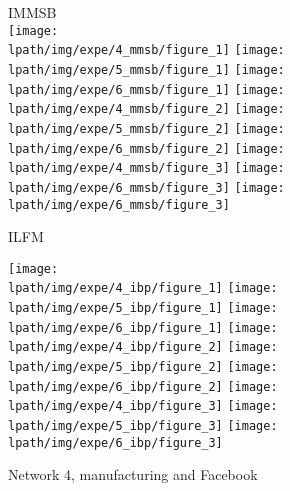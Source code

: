 \documentclass[a4paper, 12pt]{article}
\begin{document}
\begin{figure}[ht]
    \vspace{-3cm}
	\centering IMMSB\\
	\texttt{[image: \\lpath/img/expe/4\_mmsb/figure\_1]}
	\endminipage
	\texttt{[image: \\lpath/img/expe/5\_mmsb/figure\_1]}
	\endminipage
	\texttt{[image: \\lpath/img/expe/6\_mmsb/figure\_1]}
	\endminipage
		\vspace{-0.29cm}
	\texttt{[image: \\lpath/img/expe/4\_mmsb/figure\_2]}
	\endminipage
	\texttt{[image: \\lpath/img/expe/5\_mmsb/figure\_2]} 
	\endminipage
	\texttt{[image: \\lpath/img/expe/6\_mmsb/figure\_2]}
	\endminipage
		\vspace{-0.28cm}
	\texttt{[image: \\lpath/img/expe/4\_mmsb/figure\_3]}
	\endminipage
	\texttt{[image: \\lpath/img/expe/6\_mmsb/figure\_3]} 
	\endminipage
	\texttt{[image: \\lpath/img/expe/6\_mmsb/figure\_3]}
	\endminipage

    \vspace{0.2cm}
	 ILFM

	\texttt{[image: \\lpath/img/expe/4\_ibp/figure\_1]}
	\endminipage
	\texttt{[image: \\lpath/img/expe/5\_ibp/figure\_1]}
	\endminipage
	\texttt{[image: \\lpath/img/expe/6\_ibp/figure\_1]}
	\endminipage
		\vspace{-0.29cm}
	\texttt{[image: \\lpath/img/expe/4\_ibp/figure\_2]}
	\endminipage
	\texttt{[image: \\lpath/img/expe/5\_ibp/figure\_2]} 
	\endminipage
	\texttt{[image: \\lpath/img/expe/6\_ibp/figure\_2]}
	\endminipage
		\vspace{-0.28cm}
	\texttt{[image: \\lpath/img/expe/4\_ibp/figure\_3]}
	\endminipage
	\texttt{[image: \\lpath/img/expe/5\_ibp/figure\_3]} 
	\endminipage
	\texttt{[image: \\lpath/img/expe/6\_ibp/figure\_3]}
	\endminipage
    \caption{Network 4, manufacturing and Facebook}

\end{figure}
\end{document}
